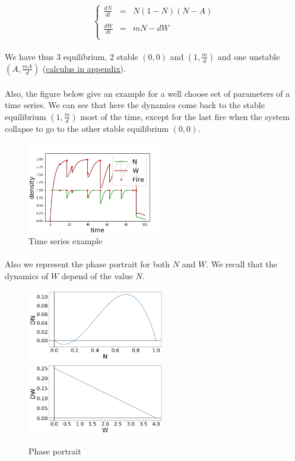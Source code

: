 \documentclass{article}
\begin{document}
\[ %
\left\lbrace
\begin{array}{rcl}
\frac{dN}{dt} & = & N(1-N)(N-A) \\
\\
\frac{dW}{dt} & = & mN -dW \\
\end{array}
\right.
\]


\paragraph{}
We have thus 3 equilibrium, 2 stable $(0, 0)$ and $(1, \frac{m}{d})$ and one unstable $(A, \frac{mA}{d})$ (\hyperref[equi]{calculus in appendix}).

\paragraph{}
Also, the figure below give an example for a well choose set of parameters of a time series. We can see that here the dynamics come back to the stable equilibrium $(1, \frac{m}{d})$ most of the time, except for the last fire when the system collapse to go to the other stable equilibrium $(0, 0)$. 

\begin{figure}[h!]
\centering
\includegraphics[width=6cm]{return_between_2.png}
\caption{Time series example}
\end{figure}

\newpage
\paragraph{}
Also we represent the phase portrait for both $N$ and $W$. We recall that the dynamics of $W$ depend of the value $N$. 

\begin{figure}[h!]
\centering
\includegraphics[width=6cm]{phase_N.png}
\includegraphics[width=6cm]{phase_W.png}
\caption{Phase portrait}
\end{figure}
\end{document}
